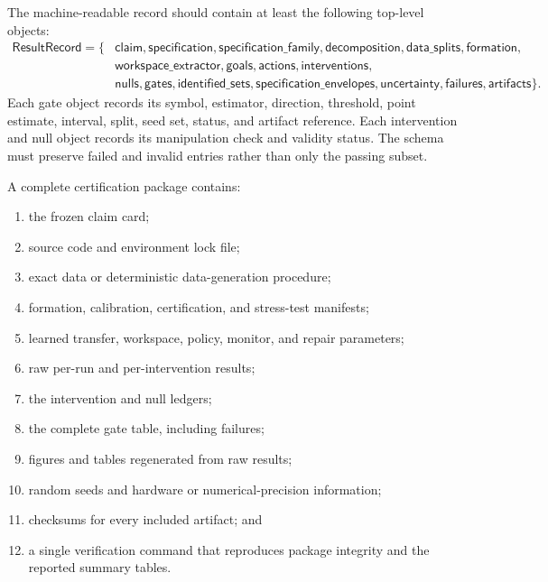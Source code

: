 The machine-readable record should contain at least the following top-level
objects:
\[
\boxed{
\begin{aligned}
\mathsf{ResultRecord}
=\{&
\mathsf{claim},
\mathsf{specification},
\mathsf{specification\_family},
\mathsf{decomposition},
\mathsf{data\_splits},
\mathsf{formation},\\
&\mathsf{workspace\_extractor},
\mathsf{goals},
\mathsf{actions},
\mathsf{interventions},\\
&\mathsf{nulls},
\mathsf{gates},
\mathsf{identified\_sets},
\mathsf{specification\_envelopes},
\mathsf{uncertainty},
\mathsf{failures},
\mathsf{artifacts}
\}.
\end{aligned}
}
\]
Each gate object records its symbol, estimator, direction, threshold, point
estimate, interval, split, seed set, status, and artifact reference. Each
intervention and null object records its manipulation check and validity
status. The schema must preserve failed and invalid entries rather than only
the passing subset.


A complete certification package contains:
\begin{enumerate}
\item the frozen claim card;
\item source code and environment lock file;
\item exact data or deterministic data-generation procedure;
\item formation, calibration, certification, and stress-test manifests;
\item learned transfer, workspace, policy, monitor, and repair parameters;
\item raw per-run and per-intervention results;
\item the intervention and null ledgers;
\item the complete gate table, including failures;
\item figures and tables regenerated from raw results;
\item random seeds and hardware or numerical-precision information;
\item checksums for every included artifact; and
\item a single verification command that reproduces package integrity and the
 reported summary tables.
\end{enumerate}


